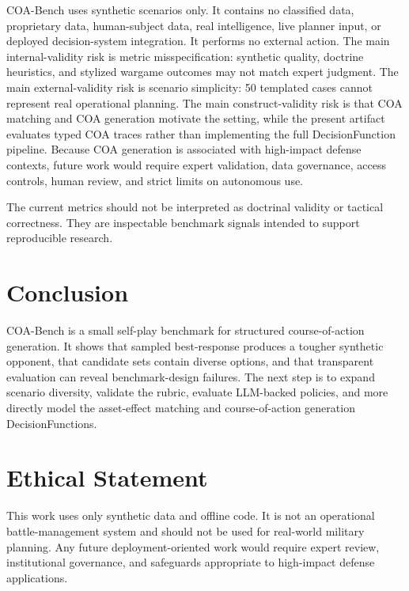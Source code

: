 \documentclass[letterpaper]{article}
\begin{document}
COA-Bench uses synthetic scenarios only. It contains no classified data, proprietary data, human-subject data, real intelligence, live planner input, or deployed decision-system integration. It performs no external action. The main internal-validity risk is metric misspecification: synthetic quality, doctrine heuristics, and stylized wargame outcomes may not match expert judgment. The main external-validity risk is scenario simplicity: 50 templated cases cannot represent real operational planning. The main construct-validity risk is that COA matching and COA generation motivate the setting, while the present artifact evaluates typed COA traces rather than implementing the full DecisionFunction pipeline. Because COA generation is associated with high-impact defense contexts, future work would require expert validation, data governance, access controls, human review, and strict limits on autonomous use.

The current metrics should not be interpreted as doctrinal validity or tactical correctness. They are inspectable benchmark signals intended to support reproducible research.

\section{Conclusion}

COA-Bench is a small self-play benchmark for structured course-of-action generation. It shows that sampled best-response produces a tougher synthetic opponent, that candidate sets contain diverse options, and that transparent evaluation can reveal benchmark-design failures. The next step is to expand scenario diversity, validate the rubric, evaluate LLM-backed policies, and more directly model the asset-effect matching and course-of-action generation DecisionFunctions.

\section*{Ethical Statement}

This work uses only synthetic data and offline code. It is not an operational battle-management system and should not be used for real-world military planning. Any future deployment-oriented work would require expert review, institutional governance, and safeguards appropriate to high-impact defense applications.


\end{document}
